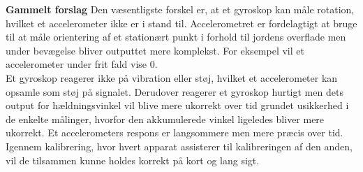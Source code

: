 \textbf{Gammelt forslag} \newline
Den væsentligste forskel er, at et gyroskop kan måle rotation, hvilket et accelerometer ikke er i stand til. Accelerometret er fordelagtigt at bruge til at måle orientering af et stationært punkt i forhold til jordens overflade men under bevægelse bliver outputtet mere komplekst. For eksempel vil et accelerometer under frit fald vise 0. \citep{Goodrich2013,TittertonWeston2004,LuingeVeltink2005} \\
Et gyroskop reagerer ikke på vibration eller støj, hvilket et accelerometer kan opsamle som støj på signalet. Derudover reagerer et gyroskop hurtigt men dets output for hældningsvinkel vil blive mere ukorrekt over tid grundet usikkerhed i de enkelte målinger, hvorfor den akkumulerede vinkel ligeledes bliver mere ukorrekt. Et accelerometers respons er langsommere men mere præcis over tid. Igennem kalibrering, hvor hvert apparat assisterer til kalibreringen af den anden, vil de tilsammen kunne holdes korrekt på kort og lang sigt. \citep{Barbour2014,Brasca2011}